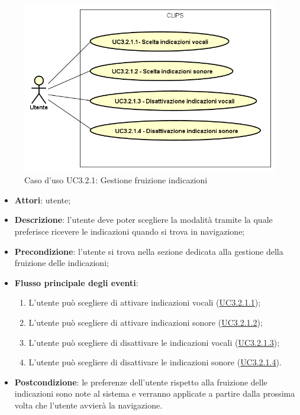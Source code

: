 \documentclass[../AnalisiDeiRequisiti.tex]{subfiles}
\begin{document}
\begin{figure}[H]
	\centering
	\includegraphics[scale=0.95, width=\textwidth]{img/UC3-2-1.png}
	\caption{Caso d'uso UC3.2.1: Gestione fruizione indicazioni}\label{fig:UC3.2.1} 
\end{figure}
\begin{itemize}
	\item \textbf{Attori}: utente;
	\item \textbf{Descrizione}: l'utente deve poter scegliere la modalità tramite la quale preferisce ricevere le indicazioni quando si trova in navigazione; 
	\item \textbf{Precondizione}: l'utente si trova nella sezione dedicata alla gestione della fruizione delle indicazioni;
	
	\item \textbf{Flusso principale degli eventi}:
	\begin{enumerate}
		\item L'utente può scegliere di attivare indicazioni vocali (\hyperlink{UC3.2.1.1}{UC3.2.1.1});
		\item L'utente può scegliere di attivare indicazioni sonore (\hyperlink{UC3.2.1.2}{UC3.2.1.2});
		\item L'utente può scegliere di disattivare le indicazioni vocali (\hyperlink{UC3.2.1.3}{UC3.2.1.3});
		\item L'utente può scegliere di disattivare le indicazioni sonore (\hyperlink{UC3.2.1.4}{UC3.2.1.4}).
		
	\end{enumerate}
	\item \textbf{Postcondizione}: le preferenze dell'utente rispetto alla fruizione delle indicazioni sono note al sistema e verranno applicate a partire dalla prossima volta che l'utente avvierà la navigazione.
\end{itemize}
\hypertarget{UC3.2.1.1}{}
\end{document}
